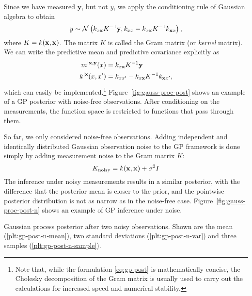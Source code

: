 Since we have measured $\mathbf{y}$, but not $y$, we apply the conditioning
rule  of Gaussian algebra to obtain
\begin{equation}
  \label{eq:gaussian-conditioning}
  y \sim \N\left( \k_{x\mathbf{x}} K\inv \mathbf{y},
  \k_{xx} - \k_{x\mathbf{x}} K\inv  \k_{\mathbf{x}x}
  \right),
\end{equation}
where $K=k(\mathbf{x},\mathbf{x})$. The matrix $K$ is called the Gram matrix
(or \emph{kernel} matrix). We can write the predictive mean and predictive
covariance explicitly as
\begin{subequations}
\label{eq:gp-post}
\begin{align}
m^{|\mathbf{x},\mathbf{y}}(x) &= k_{x\mathbf{x}} K^{-1} \mathbf{y}\\
k^{|\mathbf{x}}(x,x') &= k_{xx'} - k_{x\mathbf{x}} K^{-1}
k_{\mathbf{x}x'},
\end{align}
\end{subequations}
which can easily be implemented.\footnote[][-10mm]{Note that, while
the formulation \eqref{eq:gp-post} is mathematically concise, the Cholesky
decomposition  of the Gram
matrix is usually used to carry out the calculations for increased speed and
numerical stability.}
Figure~\ref{fig:gauss-proc-post} shows an example of a GP posterior with
noise-free observations. After conditioning on the measurements, the function
space is restricted to functions that pass through them.

So far, we only considered noise-free observations. Adding independent and
identically distributed Gaussian observation noise to the GP framework is done
simply by adding measurement noise to the Gram matrix $K$:
\begin{equation}
  \label{eq:noisy-gram-matrix}
  K_\text{noisy} = \k(\mathbf{x},\mathbf{x}) + \sigma^2 I
\end{equation}
The inference under noisy measurements results in a similar posterior, with the
difference that the posterior mean is closer to the prior, and the pointwise
posterior distribution is not as narrow as in the noise-free case.
Figure~\ref{fig:gauss-proc-post-n} shows an example of GP inference under noise.

\begin{marginfigure}[-45mm]
\setlength\figurewidth{\columnwidth}%
\setlength\figureheight{0.618\figurewidth}%
  \caption[Gaussian process posterior after two noisy observations.]
  {Gaussian process posterior after two noisy observations.
Shown are the mean (\ref*{plt:gp-post-n-mean}), two standard deviations
(\ref*{plt:gp-post-n-var}) and three samples (\ref*{plt:gp-post-n-sample}).}
  \label{fig:gauss-proc-post-n}
\end{marginfigure}

